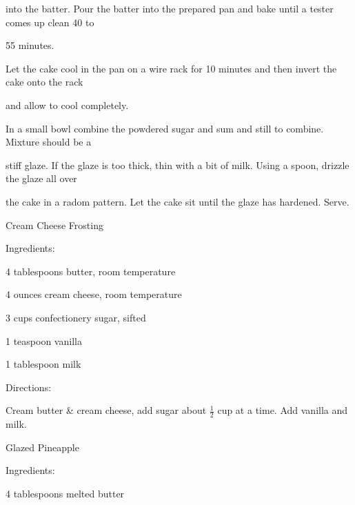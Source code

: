 \documentclass[a4paper,portrait,12pt]{book}
\begin{document}
into the batter. Pour the batter into the prepared pan and bake until a tester comes up clean 40 to




55 minutes.




Let the cake cool in the pan on a wire rack for 10 minutes and then invert the cake onto the rack




and allow to cool completely.




In a small bowl combine the powdered sugar and sum and still to combine. Mixture should be a




stiff glaze. If the glaze is too thick, thin with a bit of milk. Using a spoon, drizzle the glaze all over




the cake in a radom pattern. Let the cake sit until the glaze has hardened. Serve.







\newpage
Cream Cheese Frosting




Ingredients:




4 tablespoons butter, room temperature




4 ounces cream cheese, room temperature




3 cups confectionery sugar, sifted




1 teaspoon vanilla




1 tablespoon milk




Directions:




Cream butter \& cream cheese, add sugar about $\frac{1}{2}$ cup at a time. Add vanilla and milk.







\newpage
Glazed Pineapple




Ingredients:




4 tablespoons melted butter
\end{document}
